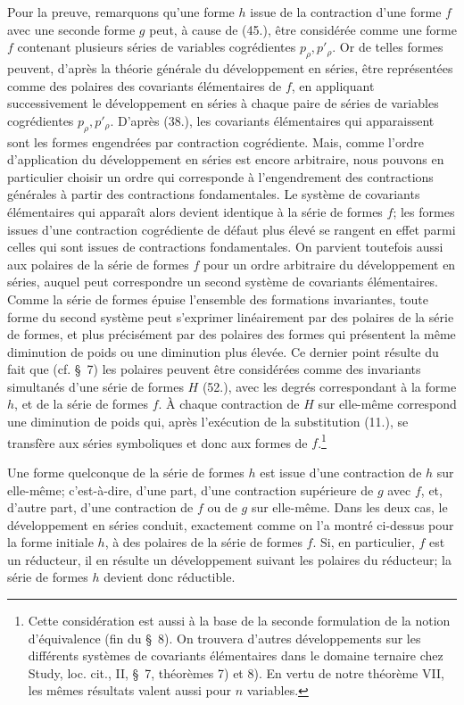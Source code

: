 \documentclass[11pt]{article}
\begin{document}
Pour la preuve, remarquons qu'une forme $h$ issue de la contraction d'une forme $f$ avec une seconde forme $g$ peut, à cause de (45.), être considérée comme une forme $f$ contenant plusieurs séries de variables cogrédientes $p_\rho,p'_\rho$. Or de telles formes peuvent, d'après la théorie générale du développement en séries, être représentées comme des polaires des covariants élémentaires de $f$, en appliquant successivement le développement en séries à chaque paire de séries de variables cogrédientes $p_\rho,p'_\rho$. D'après (38.), les covariants élémentaires qui apparaissent sont les formes engendrées par contraction cogrédiente. Mais, comme l'ordre d'application du développement en séries est encore arbitraire, nous pouvons en particulier choisir un ordre qui corresponde à l'engendrement des contractions générales à partir des contractions fondamentales. Le système de covariants élémentaires qui apparaît alors devient identique à la série de formes $f$; les formes issues d'une contraction cogrédiente de défaut plus élevé se rangent en effet parmi celles qui sont issues de contractions fondamentales. On parvient toutefois aussi aux polaires de la série de formes $f$ pour un ordre arbitraire du développement en séries, auquel peut correspondre un second système de covariants élémentaires. Comme la série de formes épuise l'ensemble des formations invariantes, toute forme du second système peut s'exprimer linéairement par des polaires de la série de formes, et plus précisément par des polaires des formes qui présentent la même diminution de poids ou une diminution plus élevée. Ce dernier point résulte du fait que (cf. \S\ 7) les polaires peuvent être considérées comme des invariants simultanés d'une série de formes $H$ (52.), avec les degrés correspondant à la forme $h$, et de la série de formes $f$. À chaque contraction de $H$ sur elle-même correspond une diminution de poids qui, après l'exécution de la substitution (11.), se transfère aux séries symboliques et donc aux formes de $f$.\footnote{Cette considération est aussi à la base de la seconde formulation de la notion d'équivalence (fin du \S\ 8). On trouvera d'autres développements sur les différents systèmes de covariants élémentaires dans le domaine ternaire chez Study, loc. cit., II, \S\ 7, théorèmes 7) et 8). En vertu de notre théorème VII, les mêmes résultats valent aussi pour $n$ variables.}

Une forme quelconque de la série de formes $h$ est issue d'une contraction de $h$ sur elle-même; c'est-à-dire, d'une part, d'une contraction supérieure de $g$ avec $f$, et, d'autre part, d'une contraction de $f$ ou de $g$ sur elle-même. Dans les deux cas, le développement en séries conduit, exactement comme on l'a montré ci-dessus pour la forme initiale $h$, à des polaires de la série de formes $f$. Si, en particulier, $f$ est un réducteur, il en résulte un développement suivant les polaires du réducteur; la série de formes $h$ devient donc réductible.
\end{document}
